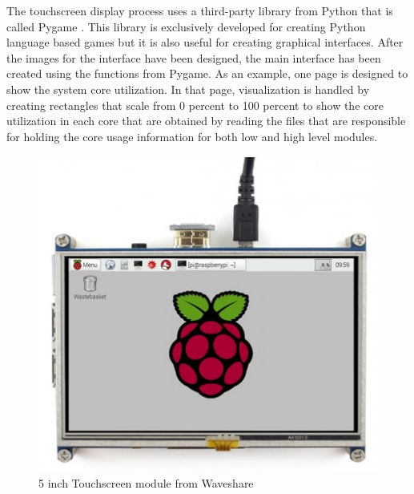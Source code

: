 The touchscreen display process uses a third-party library from Python that is called Pygame \cite{pygame}. This library is exclusively developed for creating Python language based games but it is also useful for creating graphical interfaces. After the images for the interface have been designed, the main interface has been created using the functions from Pygame. As an example, one page is designed to show the system core utilization. In that page, visualization is handled by creating rectangles that scale from 0 percent to 100 percent to show the core utilization in each core that are obtained by reading the files that are responsible for holding the core usage information for both low and high level modules.
\begin{figure}[!ht]
	\centering
	\includegraphics[scale=0.6]{content/images/touschreen5inc.jpg}
	\caption{5 inch Touchscreen module from Waveshare}
	\label{fig:touschreen5inc}
\end{figure}

